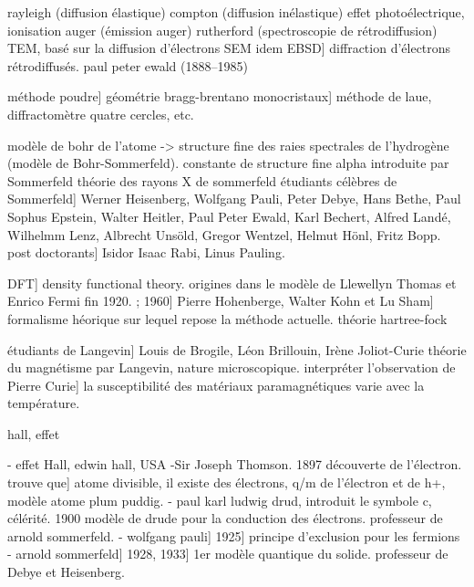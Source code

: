 rayleigh (diffusion élastique)
compton (diffusion inélastique)
effet photoélectrique, ionisation
auger (émission auger)
rutherford (spectroscopie de rétrodiffusion)
TEM, basé sur la diffusion d'électrons
SEM idem
EBSD] diffraction d'électrons rétrodiffusés.
paul peter ewald (1888--1985)

méthode poudre] géométrie bragg-brentano
monocristaux] méthode de laue, diffractomètre quatre cercles, etc.

modèle de bohr de l'atome -> structure fine des raies spectrales de l'hydrogène (modèle de Bohr-Sommerfeld).
constante de structure fine alpha introduite par Sommerfeld
théorie des rayons X de sommerfeld
étudiants célèbres de Sommerfeld] Werner Heisenberg, Wolfgang Pauli, Peter Debye, Hans Bethe, Paul Sophus Epstein, Walter Heitler, Paul Peter Ewald, Karl Bechert, Alfred Landé, Wilhelmm Lenz, Albrecht Unsöld, Gregor Wentzel, Helmut Hönl, Fritz Bopp. post doctorants] Isidor Isaac Rabi, Linus Pauling.

DFT] density functional theory. origines dans le modèle de Llewellyn Thomas et Enrico Fermi fin 1920. ; 1960] Pierre Hohenberge, Walter Kohn et Lu Sham] formalisme héorique sur lequel repose la méthode actuelle.
théorie hartree-fock

étudiants de Langevin] Louis de Brogile, Léon Brillouin, Irène Joliot-Curie
théorie du magnétisme par Langevin, nature microscopique. interpréter l'observation de Pierre Curie] la susceptibilité des matériaux paramagnétiques varie avec la température.

hall, effet

- effet Hall, edwin hall, USA
-Sir Joseph Thomson. 1897 découverte de l'électron. trouve que] atome divisible, il existe des électrons, q/m de l'électron et de h+, modèle atome plum puddig.
- paul karl ludwig drud, introduit le symbole c, célérité. 1900 modèle de drude pour la conduction des électrons. professeur de arnold sommerfeld.
- wolfgang pauli] 1925] principe d'exclusion  pour les fermions
- arnold sommerfeld] 1928, 1933] 1er modèle quantique du solide. professeur de Debye et Heisenberg.
